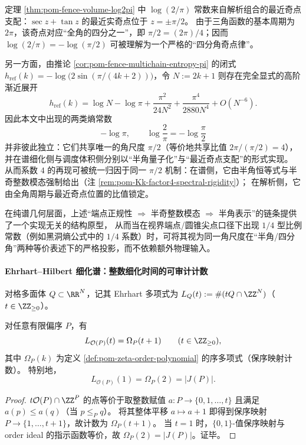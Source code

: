 \begin{remark}\label{rem:pom-quarter-turn-pi2-scale}
定理 \ref{thm:pom-fence-volume-log2pi} 中 \(\log(2/\pi)\) 常数来自解析组合的最近奇点支配：\(\sec z+\tan z\) 的最近实奇点位于 \(z=\pm\pi/2\)。
由于三角函数的基本周期为 \(2\pi\)，该奇点对应“全角的四分之一”，即 \(\pi/2=(2\pi)/4\)；因而 \(\log(2/\pi)=-\log(\pi/2)\) 可被理解为一个严格的“四分角奇点律”。
\par
另一方面，由推论 \ref{cor:pom-fence-multichain-entropy-pi} 的闭式
\(
h_{\mathrm{ref}}(k)=-\log\!\bigl(2\sin(\pi/(4k+2))\bigr)
\)，令 \(N:=2k+1\) 则存在完全显式的高阶渐近展开
\[
h_{\mathrm{ref}}(k)
=\log N-\log\pi+\frac{\pi^2}{24N^2}+\frac{\pi^4}{2880N^4}+O(N^{-6}).
\]
因此本文中出现的两类熵常数
\[
-\log\pi,\qquad \log\frac{2}{\pi}=-\log\frac{\pi}{2}
\]
并非彼此独立：它们共享唯一的角尺度 \(\pi/2\)（等价地共享比值 \(2\pi/(\pi/2)=4\)），并在谱细化侧与调度体积侧分别以“半角量子化”与“最近奇点支配”的形式实现。
从而系数 \(4\) 的再现可被统一归因于同一 \(\pi/2\) 机制：在谱侧，它由半角恒等式与半奇整数模态强制给出（注 \ref{rem:pom-Kk-factor4-spectral-rigidity}）；
在解析侧，它由全角周期与最近奇点位置的比值锁定。
\par
在纯谱几何层面，上述“端点正规性 \(\Rightarrow\) 半奇整数模态 \(\Rightarrow\) 半角表示”的链条提供了一个实现无关的结构原型，
从而当在视界端点/圆锥尖点口径下出现 \(1/4\) 型比例常数（例如黑洞熵公式中的 \(1/4\) 系数）时，可将其视为同一角尺度在“半角/四分角”两种等价表述下的严格投影，而不依赖额外物理输入。
\end{remark}

\paragraph{Ehrhart--Hilbert 细化谱：整数细化时间的可审计计数}

\begin{definition}\label{def:pom-ehrhart-order-polytope}
对格多面体 \(Q\subset\RR^N\)，记其 Ehrhart 多项式为
\(
L_Q(t):=\#(tQ\cap\ZZ^N)
\)（\(t\in\ZZ_{\ge 0}\)）。
\end{definition}

\begin{theorem}[order polytope 的 Ehrhart 计数 = 序多项式（带平移）]\label{thm:pom-ehrhart-equals-orderpoly-shift}
对任意有限偏序 \(P\)，有
\[
L_{\mathcal O(P)}(t)=\Omega_P(t+1)\qquad(t\in\ZZ_{\ge 0}),
\]
其中 \(\Omega_P(k)\) 为定义 \ref{def:pom-zeta-order-polynomial} 的序多项式（保序映射计数）。
特别地，
\[
L_{\mathcal O(P)}(1)=\Omega_P(2)=|J(P)|.
\]
\end{theorem}
\begin{proof}
\(t\mathcal O(P)\cap\ZZ^P\) 的点等价于取整数赋值 \(a:P\to\{0,1,\dots,t\}\) 且满足 \(a(p)\le a(q)\)（当 \(p\le_P q\)）。
将其整体平移 \(a\mapsto a+1\) 即得到保序映射 \(P\to\{1,\dots,t+1\}\)，故计数为 \(\Omega_P(t+1)\)。
当 \(t=1\) 时，\(\{0,1\}\)-值保序映射与 order ideal 的指示函数等价，故 \(\Omega_P(2)=|J(P)|\)。证毕。
\end{proof}

